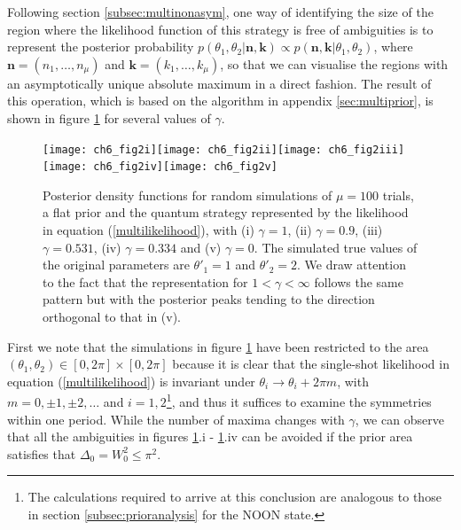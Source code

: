 Following section \ref{subsec:multinonasym}, one way of identifying the size of the region where the likelihood function of this strategy is free of ambiguities is to represent the posterior probability $p(\theta_1, \theta_2|\boldsymbol{n}, \boldsymbol{k}) \propto p(\boldsymbol{n}, \boldsymbol{k} |\theta_1, \theta_2)$, where $\boldsymbol{n} = (n_1, \dots, n_\mu)$ and $\boldsymbol{k} = (k_1, \dots, k_\mu)$, so that we can visualise the regions with an asymptotically unique absolute maximum in a direct fashion. The result of this operation, which is based on the algorithm in appendix \ref{sec:multiprior}, is shown in figure \ref{priornetwork} for several values of $\gamma$. 

\begin{figure}[t]
\centering
\texttt{[image: ch6\_fig2i]}\texttt{[image: ch6\_fig2ii]}\texttt{[image: ch6\_fig2iii]}
\texttt{[image: ch6\_fig2iv]}\texttt{[image: ch6\_fig2v]}
\caption[Prior information analysis of a two-parameter scheme]{Posterior density functions for random simulations of $\mu = 100$ trials, a flat prior and the quantum strategy represented by the likelihood in equation (\ref{multilikelihood}), with (i) $\gamma = 1$, (ii) $\gamma = 0.9$, (iii) $\gamma = 0.531$, (iv) $\gamma = 0.334$ and (v) $\gamma = 0$. The simulated true values of the original parameters are $\theta'_1=1$ and $\theta'_2=2$. We draw attention to the fact that the representation for $1 < \gamma < \infty $ follows the same pattern but with the posterior peaks tending to the direction orthogonal to that in (v).}
\label{priornetwork}
\end{figure}

First we note that the simulations in figure \ref{priornetwork} have been restricted to the area $(\theta_1, \theta_2) \in [0, 2\pi]\times [0, 2\pi]$ because it is clear that the single-shot likelihood in equation (\ref{multilikelihood}) is invariant under   $\theta_i \rightarrow \theta_i + 2\pi m$, with $m = 0, \pm 1, \pm 2, \dots$ and $i=1,2$\footnote{The calculations required to arrive at this conclusion are analogous to those in section \ref{subsec:prioranalysis} for the NOON state.}, and thus it suffices to examine the symmetries within one period. While the number of maxima changes with $\gamma$, we can observe that all the ambiguities in figures \ref{priornetwork}.i - \ref{priornetwork}.iv can be avoided if the prior area satisfies that $\Delta_0 = W_0^2 \leqslant \pi^2$. 

